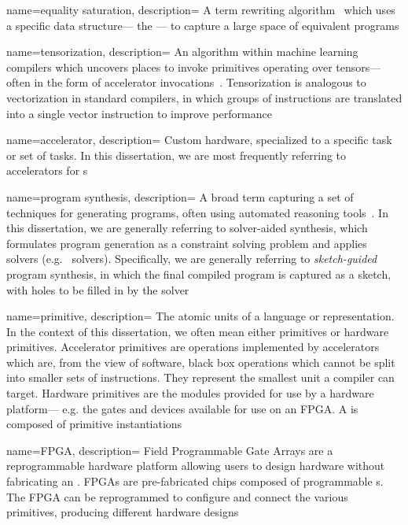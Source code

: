 {
    name={equality saturation},
    description={
A term rewriting algorithm~\cite{tate2009equality,tate2011equality,willsey2021egg}
  which uses a specific data structure---%
  the \egr---%
  to capture a large space of equivalent programs}
}

{
    name={tensorization},
    description={
An algorithm within machine learning compilers
  which uncovers places to invoke primitives
  operating over tensors---%
  often in the form of accelerator 
  invocations~\cite{tvmtensorization}.
Tensorization is analogous to vectorization
  in standard compilers,
  in which groups of instructions are translated
  into a single vector instruction
  to improve performance}
}

{
    name={accelerator},
    description={
Custom hardware, specialized to a specific task
  or set of tasks.
In this dissertation,
  we are most frequently referring to
  accelerators for
  s}
}

{
    name={program synthesis},
    description={
A broad term capturing a set of 
  techniques for generating programs,
  often using automated reasoning tools~\cite{gulwani2017program}.
In this dissertation,
  we are generally referring to solver-aided synthesis,
  which formulates program generation as a constraint solving problem
  and applies solvers (e.g.~ solvers).
Specifically, we are generally referring to
  \textit{sketch-guided} program synthesis,
  in which the final compiled program
  is captured as a sketch, with holes to be filled in by the solver~\cite{solar2008program}}
}

{
    name={primitive},
    description={
The atomic units of a language or representation.
In the context of this dissertation, we often mean
  either  primitives
  or hardware primitives.
Accelerator primitives are operations
  implemented by accelerators which are, from the 
  view of software, black box operations
  which cannot be split into smaller sets of instructions.
They represent the smallest unit
  a compiler can target.
Hardware primitives are the modules
  provided for use by a hardware platform---%
  e.g. the gates and devices available for use
  on an FPGA.
A 
  is composed of primitive instantiations}
}

{
    name={FPGA},
    description={
Field Programmable Gate Arrays are
  a reprogrammable hardware platform
  allowing users to design hardware
  without fabricating an .
FPGAs are pre-fabricated chips
  composed of programmable s.
The FPGA can be reprogrammed
  to configure and connect the various primitives,
  producing different hardware designs}
}

